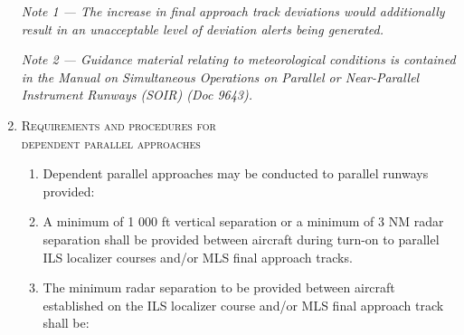\documentclass[../main.tex]{subfiles}
\begin{document}
\begin{enumerate}[itemsep=0.2cm]
\begin{enumempty}
            \textit{Note 1 --- The increase in final approach track deviations would additionally result in an unacceptable level of deviation alerts being generated.}

            \textit{Note 2 --- Guidance material relating to meteorological conditions is contained in the \emph{Manual on Simultaneous Operations on Parallel or Near-Parallel Instrument Runways (SOIR)} (Doc 9643).}
        \end{enumempty}

        \item \textsc{Requirements and procedures for \\ dependent parallel approaches}
        \begin{enumerate}
            \item Dependent parallel approaches may be conducted to parallel runways provided:


            \item A minimum of 1 000 ft vertical separation or a minimum of 3 NM radar separation shall be provided between aircraft during turn-on to parallel ILS localizer courses and/or MLS final approach tracks.
            \item The minimum radar separation to be provided between aircraft established on the ILS localizer course and/or MLS final approach track shall be:


\end{enumerate}
\end{enumerate}
\end{document}
